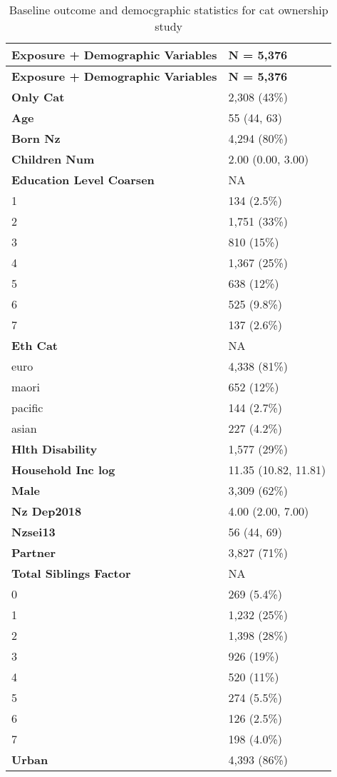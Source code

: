 \documentclass[
  singlecolumn,
  9pt]{article}
\begin{document}
\begin{longtable}[]{@{}ll@{}}
\caption{Baseline outcome and democgraphic statistics for cat ownership
study}\label{tbl-table_demographic_vars_cats-m}\tabularnewline
\toprule\noalign{}
\textbf{Exposure + Demographic Variables} & \textbf{N = 5,376} \\
\midrule\noalign{}
\endfirsthead
\toprule\noalign{}
\textbf{Exposure + Demographic Variables} & \textbf{N = 5,376} \\
\midrule\noalign{}
\endhead
\bottomrule\noalign{}
\endlastfoot
\textbf{Only Cat} & 2,308 (43\%) \\
\textbf{Age} & 55 (44, 63) \\
\textbf{Born Nz} & 4,294 (80\%) \\
\textbf{Children Num} & 2.00 (0.00, 3.00) \\
\textbf{Education Level Coarsen} & NA \\
1 & 134 (2.5\%) \\
2 & 1,751 (33\%) \\
3 & 810 (15\%) \\
4 & 1,367 (25\%) \\
5 & 638 (12\%) \\
6 & 525 (9.8\%) \\
7 & 137 (2.6\%) \\
\textbf{Eth Cat} & NA \\
euro & 4,338 (81\%) \\
maori & 652 (12\%) \\
pacific & 144 (2.7\%) \\
asian & 227 (4.2\%) \\
\textbf{Hlth Disability} & 1,577 (29\%) \\
\textbf{Household Inc log} & 11.35 (10.82, 11.81) \\
\textbf{Male} & 3,309 (62\%) \\
\textbf{Nz Dep2018} & 4.00 (2.00, 7.00) \\
\textbf{Nzsei13} & 56 (44, 69) \\
\textbf{Partner} & 3,827 (71\%) \\
\textbf{Total Siblings Factor} & NA \\
0 & 269 (5.4\%) \\
1 & 1,232 (25\%) \\
2 & 1,398 (28\%) \\
3 & 926 (19\%) \\
4 & 520 (11\%) \\
5 & 274 (5.5\%) \\
6 & 126 (2.5\%) \\
7 & 198 (4.0\%) \\
\textbf{Urban} & 4,393 (86\%) \\
\end{longtable}
\end{document}

